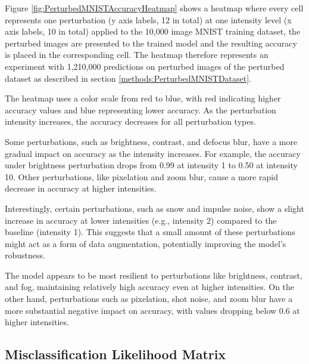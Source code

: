 Figure \ref{fig:PerturbedMNISTAccuracyHeatmap} shows a heatmap where every cell represents one perturbation (y axis labels, 12 in total) at one intensity level (x axis labels, 10 in total) applied to the 10,000 image MNIST training dataset, the perturbed images are presented to the trained model and the resulting accuracy is placed in the corresponding cell. The heatmap therefore represents an experiment with 1,210,000 predictions on perturbed images of the perturbed dataset as described in section \ref{methods:PerturbedMNISTDataset}.

The heatmap uses a color scale from red to blue, with red indicating higher accuracy values and blue representing lower accuracy. As the perturbation intensity increases, the accuracy decreases for all perturbation types.

Some perturbations, such as brightness, contrast, and defocus blur, have a more gradual impact on accuracy as the intensity increases. For example, the accuracy under brightness perturbation drops from 0.99 at intensity 1 to 0.50 at intensity 10. Other perturbations, like pixelation and zoom blur, cause a more rapid decrease in accuracy at higher intensities.

Interestingly, certain perturbations, such as snow and impulse noise, show a slight increase in accuracy at lower intensities (e.g., intensity 2) compared to the baseline (intensity 1). This suggests that a small amount of these perturbations might act as a form of data augmentation, potentially improving the model's robustness.

The model appears to be most resilient to perturbations like brightness, contrast, and fog, maintaining relatively high accuracy even at higher intensities. On the other hand, perturbations such as pixelation, shot noise, and zoom blur have a more substantial negative impact on accuracy, with values dropping below 0.6 at higher intensities.


\subsection{Misclassification Likelihood Matrix}

